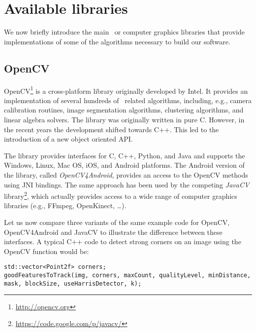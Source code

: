 \section{Available libraries}
\label{lib} 

We now briefly introduce the main \cv\ or computer graphics libraries that provide implementations of some of the algorithms necessary to build our software. %


\subsection{OpenCV} 

OpenCV\footnote{\url{http://opencv.org}} is a cross-platform library originally developed by Intel. 
It provides an implementation of several hundreds of \cv\ related algorithms, 
including, e.g., camera calibration routines, image segmentation algorithms, clustering algorithms, and linear algebra solvers.
The library was originally written in pure C. 
However, in the recent years the development shifted towards C++. 
This led to the introduction of a new object oriented API. 

The library provides interfaces for C, C++, Python, and Java and supports the Windows, Linux, Mac OS, iOS, and Android platforms. 
The Android version of the library, called {\it OpenCV4Android}, provides an access to the OpenCV methods using JNI bindings.
The same approach has been used by the competing {\it JavaCV} library\footnote{\url{https://code.google.com/p/javacv/}}, which actually provides access to a wide range of computer graphics libraries (e.g., FFmpeg, OpenKinect, \dots). 

Let us now compare three variants of the same example code for OpenCV, OpenCV4Android and JavaCV to illustrate the difference between these interfaces.
A typical C++ code to detect strong corners on an image using the OpenCV function  would be: 

\begin{lstlisting} 
std::vector<Point2f> corners; 
goodFeaturesToTrack(img, corners, maxCount, qualityLevel, minDistance, mask, blockSize, useHarrisDetector, k);
\end{lstlisting}

